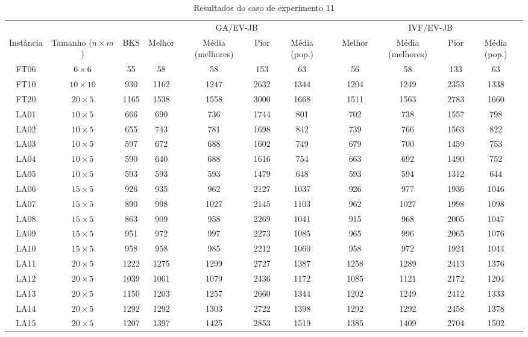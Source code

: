\begin{sidewaystable}
\caption{Resultados do caso de experimento 11}
\centering
\label{experimento11}
\begin{tabular}{cccccccccccc}
\toprule
& & & \multicolumn{4}{c}{GA/EV-JB} & & \multicolumn{4}{c}{IVF/EV-JB} \\
\cmidrule(c){4-7}
\cmidrule(c){9-12}
Inst\^{a}ncia & Tamanho ($n \times m$) & BKS & Melhor & M\'{e}dia (melhores) & Pior & M\'{e}dia (pop.) & & Melhor & M\'{e}dia (melhores) & Pior & M\'{e}dia (pop.) \\
\midrule
FT06 & $6 \times 6$ & 55 & 58 & 58 & 153 & 63 & & 56 & 58 & 133 & 63 \\
FT10 & $10 \times 10$ & 930 & 1162 & 1247 & 2632 & 1344 & & 1204 & 1249 & 2353 & 1338 \\
FT20 & $20 \times 5$ & 1165 & 1538 & 1558 & 3000 & 1668 & & 1511 & 1563 & 2783 & 1660 \\
LA01 & $10 \times 5$ & 666 & 690 & 736 & 1744 & 801 & & 702 & 738 & 1557 & 798 \\
LA02 & $10 \times 5$ & 655 & 743 & 781 & 1698 & 842 & & 739 & 766 & 1563 & 822 \\
LA03 & $10 \times 5$ & 597 & 672 & 688 & 1602 & 749 & & 679 & 700 & 1459 & 753 \\
LA04 & $10 \times 5$ & 590 & 640 & 688 & 1616 & 754 & & 663 & 692 & 1490 & 752 \\
LA05 & $10 \times 5$ & 593 & 593 & 593 & 1479 & 648 & & 593 & 594 & 1312 & 644 \\
LA06 & $15 \times 5$ & 926 & 935 & 962 & 2127 & 1037 & & 926 & 977 & 1936 & 1046 \\
LA07 & $15 \times 5$ & 890 & 998 & 1027 & 2145 & 1103 & & 962 & 1027 & 1998 & 1098 \\
LA08 & $15 \times 5$ & 863 & 909 & 958 & 2269 & 1041 & & 915 & 968 & 2005 & 1047 \\
LA09 & $15 \times 5$ & 951 & 972 & 997 & 2273 & 1085 & & 965 & 996 & 2065 & 1076 \\
LA10 & $15 \times 5$ & 958 & 958 & 985 & 2212 & 1060 & & 958 & 972 & 1924 & 1044 \\
LA11 & $20 \times 5$ & 1222 & 1275 & 1299 & 2727 & 1387 & & 1258 & 1289 & 2413 & 1376 \\
LA12 & $20 \times 5$ & 1039 & 1061 & 1079 & 2436 & 1172 & & 1085 & 1121 & 2172 & 1204 \\
LA13 & $20 \times 5$ & 1150 & 1203 & 1257 & 2660 & 1344 & & 1202 & 1249 & 2412 & 1333 \\
LA14 & $20 \times 5$ & 1292 & 1292 & 1303 & 2722 & 1398 & & 1292 & 1292 & 2458 & 1378 \\
LA15 & $20 \times 5$ & 1207 & 1397 & 1425 & 2853 & 1519 & & 1385 & 1409 & 2704 & 1502 \\
\bottomrule
\end{tabular}
\end{sidewaystable}
